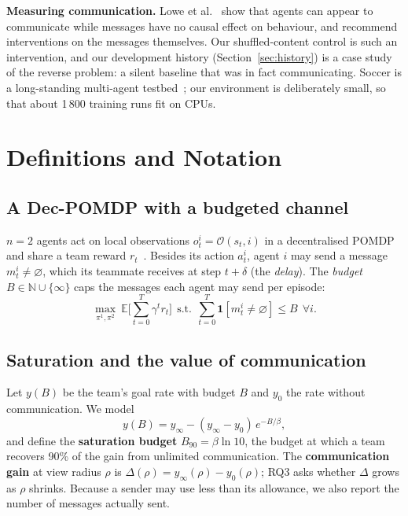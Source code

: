\documentclass[twocolumn]{article}
\newcommand{\E}{\mathbb{E}}
\newcommand{\ind}{\mathbf{1}}
\begin{document}
\textbf{Measuring communication.} Lowe et al.~\citep{lowe2019} show that agents can appear to
communicate while messages have no causal effect on behaviour, and recommend interventions on the
messages themselves. Our shuffled-content control is such an intervention, and our development
history (Section~\ref{sec:history}) is a case study of the reverse problem: a silent baseline that was
in fact communicating. Soccer is a long-standing multi-agent testbed~\citep{kurach2020}; our
environment is deliberately small, so that about 1\,800 training runs fit on CPUs.

\section{Definitions and Notation}

\subsection{A Dec-POMDP with a budgeted channel}

$n=2$ agents act on local observations $o^i_t=\mathcal O(s_t,i)$ in a decentralised POMDP and share a
team reward $r_t$~\citep{oliehoek2016}. Besides its action $a^i_t$, agent $i$ may send a message
$m^i_t\neq\varnothing$, which its teammate receives at step $t+\delta$ (the \emph{delay}). The
\emph{budget} $B\in\mathbb N\cup\{\infty\}$ caps the messages each agent may send per episode:
\begin{equation}
\max_{\pi^1,\pi^2}\ \E\Big[\sum_{t=0}^{T}\gamma^t r_t\Big]
\ \ \text{s.t.}\ \ \sum_{t=0}^{T}\ind[m^i_t\neq\varnothing]\le B\ \ \forall i.
\end{equation}

\subsection{Saturation and the value of communication}

Let $y(B)$ be the team's goal rate with budget $B$ and $y_0$ the rate without communication. We model
\begin{equation}
y(B)=y_\infty-(y_\infty-y_0)\,e^{-B/\beta},
\label{eq:sat}
\end{equation}
and define the \textbf{saturation budget} $B_{90}=\beta\ln 10$, the budget at which a team recovers 90\%
of the gain from unlimited communication. The \textbf{communication gain} at view radius $\rho$ is
$\Delta(\rho)=y_\infty(\rho)-y_0(\rho)$; RQ3 asks whether $\Delta$ grows as $\rho$ shrinks. Because a
sender may use less than its allowance, we also report the number of messages actually sent.
\end{document}
